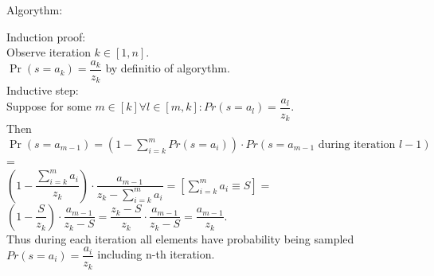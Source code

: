 Algorythm:\\
\begin{algorithm}[H]
\end{algorithm}
Induction proof:\\
Observe iteration $k \in [1, n]$. \\$\Pr(s = a_k)=\dfrac{a_k}{z_k}$ by definitio of algorythm.\\
Inductive step:\\
Suppose for some $m \in [k]\forall l \in [m, k]: Pr(s = a_l) = \dfrac{a_l}{z_k}$. \\
Then $\Pr(s = a_{m-1}) = (1 - \sum_{i = k}^m Pr(s = a_i)) \cdot Pr(s = a_{m-1} \text{ during iteration $l-1$})$=\\$
(1 - \dfrac{\sum_{i = k}^m a_i}{z_k})\cdot \dfrac{a_{m-1}}{z_k - \sum_{i = k}^m a_i} = [\sum_{i = k}^m a_i \equiv S] =$\\$ 
(1 - \dfrac{S}{z_k})\cdot \dfrac{a_{m-1}}{z_k - S} = \dfrac{z_k - S}{z_k}\cdot \dfrac{a_{m-1}}{z_k-S} = 
\dfrac{a_{m-1}}{z_k}
$.\\
Thus during each iteration all elements have probability being sampled $Pr(s = a_i) = \dfrac{a_i}{z_k}$ including n-th iteration.